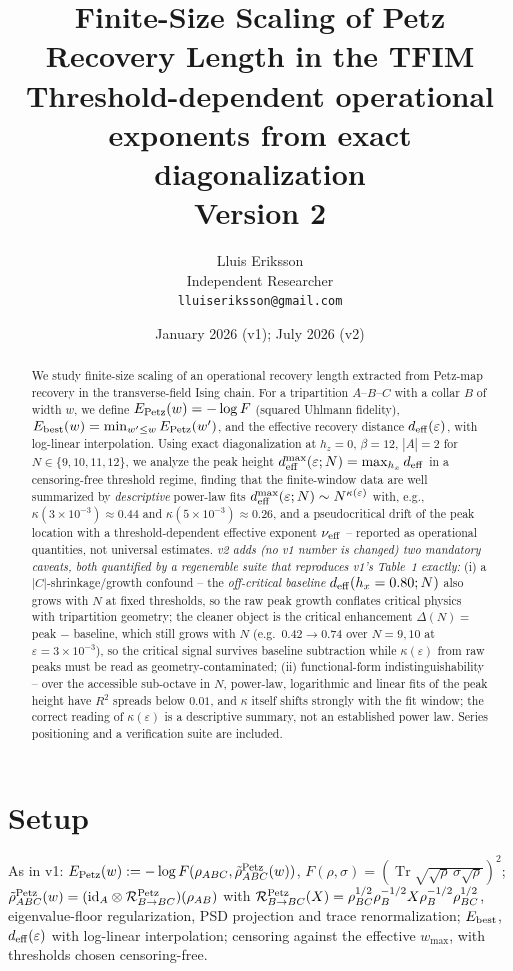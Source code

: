 \documentclass[11pt]{article}
\title{Finite-Size Scaling of Petz Recovery Length in the TFIM\\
{\large Threshold-dependent operational exponents from exact
diagonalization}\\
{\normalsize Version 2}}
\author{Lluis Eriksson\\ Independent Researcher\\ \texttt{lluiseriksson@gmail.com}}
\date{January 2026 (v1); July 2026 (v2)}
\theoremstyle{remark}
\newcommand{\Tr}{\operatorname{Tr}}
\newcommand{\deff}{d_{\rm eff}}
\newcommand{\dmax}{d^{\max}_{\rm eff}}
\begin{document}
\maketitle

\begin{abstract}
We study finite-size scaling of an operational recovery length extracted
from Petz-map recovery in the transverse-field Ising chain. For a
tripartition $A$--$B$--$C$ with a collar $B$ of width $w$, we define
$E_{\rm Petz}(w) = -\log F$ (squared Uhlmann fidelity), $E_{\rm best}(w)
= \min_{w' \le w} E_{\rm Petz}(w')$, and the effective recovery distance
$\deff(\varepsilon)$, with log-linear interpolation. Using exact
diagonalization at $h_z = 0$, $\beta = 12$, $|A| = 2$ for $N \in \{9, 10,
11, 12\}$, we analyze the peak height $\dmax(\varepsilon; N) = \max_{h_x}
\deff$ in a censoring-free threshold regime, finding that the
finite-window data are well summarized by \emph{descriptive} power-law
fits $\dmax(\varepsilon; N) \sim N^{\kappa(\varepsilon)}$ with, e.g.,
$\kappa(3\times10^{-3}) \approx 0.44$ and $\kappa(5\times10^{-3}) \approx
0.26$, and a pseudocritical drift of the peak location with a
threshold-dependent effective exponent $\nu_{\rm eff}$ -- reported as
operational quantities, not universal estimates. \emph{v2 adds (no v1
number is changed) two mandatory caveats, both quantified by a
regenerable suite that reproduces v1's Table~1 exactly:} (i) a
$|C|$-shrinkage/growth confound -- the \emph{off-critical baseline}
$\deff(h_x = 0.80; N)$ also grows with $N$ at fixed thresholds, so the
raw peak growth conflates critical physics with tripartition geometry;
the cleaner object is the critical enhancement $\Delta(N) = $ peak
$-$ baseline, which still grows with $N$ (e.g.\ $0.42 \to 0.74$ over
$N = 9, 10$ at $\varepsilon = 3\times10^{-3}$), so the critical signal
survives baseline subtraction while $\kappa(\varepsilon)$ from raw peaks
must be read as geometry-contaminated; (ii) functional-form
indistinguishability -- over the accessible sub-octave in $N$, power-law,
logarithmic and linear fits of the peak height have $R^2$ spreads below
$0.01$, and $\kappa$ itself shifts strongly with the fit window; the
correct reading of $\kappa(\varepsilon)$ is a descriptive summary, not an
established power law. Series positioning and a verification suite are
included.
\end{abstract}

\section{Setup}
As in v1: $E_{\rm Petz}(w) := -\log F(\rho_{ABC},
\tilde\rho^{\rm Petz}_{ABC}(w))$, $F(\rho,\sigma) =
(\Tr\sqrt{\sqrt\rho\,\sigma\sqrt\rho})^2$;
$\tilde\rho^{\rm Petz}_{ABC}(w) = (\mathrm{id}_A \otimes
\mathcal{R}^{\rm Petz}_{B\to BC})(\rho_{AB})$ with
$\mathcal{R}^{\rm Petz}_{B\to BC}(X) = \rho_{BC}^{1/2}\rho_B^{-1/2} X
\rho_B^{-1/2}\rho_{BC}^{1/2}$, eigenvalue-floor regularization, PSD
projection and trace renormalization; $E_{\rm best}$, $\deff(\varepsilon)$
with log-linear interpolation; censoring against the effective
$w_{\max}$, with thresholds chosen censoring-free.
\end{document}
